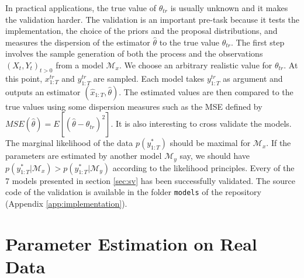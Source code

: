 \documentclass[11pt,a4,twosided,singlespacing,titlepagenumber=on]{scrreprt}
\numberwithin{equation}{chapter} %
\theoremstyle{remark}
\begin{document}
In practical applications, the true value of $\theta_{tr}$ is usually unknown and it makes the validation harder. The validation is an important pre-task because it tests the implementation, the choice of the priors and the proposal distributions, and measures the dispersion of the estimator $\hat{\theta}$ to the true value $\theta_{tr}$. The first step involves the sample generation of both the process and the observations $(X_t, Y_t)_{t > 0}$ from a model $\mathcal{M}_x$. We choose an arbitrary realistic value for $\theta_{tr}$. At this point, $x^{tr}_{1:T}$ and $y^{tr}_{1:T}$ are sampled. Each model takes $y^{tr}_{1:T}$ as argument and outputs an estimator $(\hat{x}_{1:T}, \hat{\theta})$. The estimated values are then compared to the true values using some dispersion measures such as the MSE defined by $MSE(\hat{\theta}) = E[ ( \hat{\theta} - \theta_{tr} )^2 ]$. It is also interesting to cross validate the models. The marginal likelihood of the data $p(y^*_{1:T})$ should be maximal for $\mathcal{M}_x$. If the parameters are estimated by another model $\mathcal{M}_y$ say, we should have $p(y^*_{1:T} | \mathcal{M}_x) > p(y^*_{1:T} | \mathcal{M}_y)$ according to the likelihood principles. Every of the 7 models presented in section \ref{sec:sv} has been successfully validated. The source code of the validation is available in the folder \texttt{models} of the repository (Appendix \ref{app:implementation}).

\section{Parameter Estimation on Real Data}
\end{document}
